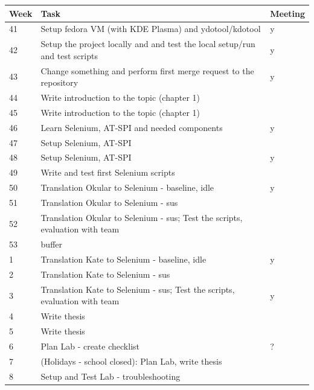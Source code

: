  \begin{table}[ht]
 \centering
    \begin{tabularx}{\textwidth}{|p{1cm}|X|p{1.5cm}|}
    \hline
    Week & Task & Meeting \\
    \hline\hline
    41  & Setup fedora VM (with KDE Plasma) and ydotool/kdotool & y \\
    \hline
    42  & Setup the project locally and and test the local setup/run and test scripts & y \\
    \hline
    43  & Change something and perform first merge request to the repository & y \\
    \hline
    44  & Write introduction to the topic (chapter 1) & \\
    \hline
    45  & Write introduction to the topic (chapter 1) & \\
    \hline
    46  & Learn Selenium, AT-SPI and needed components & y \\
    \hline
    47  & Setup Selenium, AT-SPI & \\
    \hline
    48  &  Setup Selenium, AT-SPI & y \\
    \hline
    49  &  Write and test first Selenium scripts & \\
    \hline
    50  &  Translation Okular to Selenium - baseline, idle & y \\
    \hline
    51  & Translation Okular to Selenium - sus & \\
    \hline
    52  & Translation Okular to Selenium - sus; Test the scripts, evaluation with team & \\
    \hline
    53  & buffer & \\
    \hline
    1  & Translation Kate to Selenium - baseline, idle & y \\
    \hline
    2  & Translation Kate to Selenium - sus & \\
    \hline
    3  & Translation Kate to Selenium - sus; Test the scripts, evaluation with team & y \\
    \hline
    4  & Write thesis & \\
    \hline
    5  & Write thesis & \\
    \hline
    6  & Plan Lab - create checklist & ? \\
    \hline
    7  & (Holidays - school closed): Plan Lab, write thesis &  \\
    \hline
    8  & Setup and Test Lab - troubleshooting &  \\

\end{tabularx}
\end{table}
